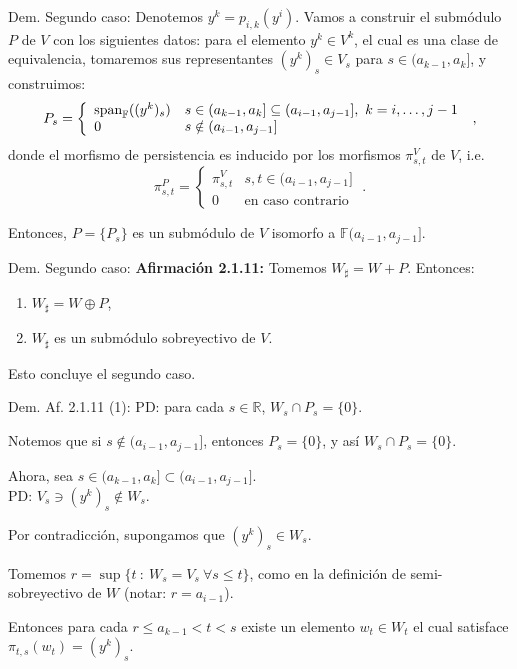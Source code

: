 \documentclass{beamer}
\def\R{\mathbb{R}}
\def\F {\mathbb{F}}
\begin{document}
\begin{frame}{Dem. Segundo caso:}
    Denotemos $y^k = p_{i,k} (y^i)$.
Vamos a construir el submódulo $P$ de $V$ con los siguientes datos: \pause para el elemento $y^k \in V^k$, el cual es una clase de equivalencia, tomaremos sus representantes $(y^k)_s \in V_s$ para $s\in  (a_{k-1}, a_{k}]$,  y construimos:
$$
P_s = \left\{
	\begin{array}{ll}
		\spn_{\F}((y^k)_s) 	& s \in (a_{k-1}, a_{k}] \subseteq (a_{i-1},a_{j-1}],\ k=i, \ldots, j-1 \\
  		0  					& s \notin (a_{i-1}, a_{j-1}] 
	\end{array}
		\right. \;,
$$
\pause donde el morfismo de persistencia es inducido por los morfismos  $\pi^V_{s,t}$ de $V$, i.e.
$$
\pi^P_{s,t} = \left\{
\begin{array}{ll}
	\pi^V_{s,t}  	& s, t \in (a_{i-1}, a_{j-1}]  \\
	0 				& \text{en caso contrario}
\end{array}
\right. \;.
$$

Entonces, $P = \{P_s\}$ es un submódulo de $V$ isomorfo a $\F (a_{i-1}, a_{j-1}]$.

\end{frame}


\begin{frame}{Dem. Segundo caso:}
    \textbf{Afirmación 2.1.11:} 
	Tomemos $W_{\sharp} = W + P$. Entonces:
\begin{enumerate}
	\item
		$W_{\sharp} = W \oplus P$,
	\item
		$W_{\sharp}$ es un submódulo sobreyectivo de $V$.
\end{enumerate}

Esto concluye el segundo caso.

\end{frame}

\begin{frame}{Dem. Af. 2.1.11 (1):}
PD: para cada $s\in \R$, $W_s \cap P_s = \{0\}$. \\[0.2cm ]\pause

Notemos que si $s \notin (a_{i-1}, a_{j-1}]$, entonces $P_s = \{0\}$, y así $W_s \cap P_s = \{0\}$.\\[0.2cm] \pause

Ahora, sea $s\in (a_{k-1}, a_{k}] \subset (a_{i-1}, a_{j-1}]$. \\

PD: $V_s \ni (y^k)_s \notin W_s$.\\[0.2cm] \pause

Por contradicción, supongamos que $(y^k)_s \in W_s$. \pause

Tomemos $r = \sup \{ t\ :\ W_s=V_s \ \forall s\leq t \}$, como en la definición de semi-sobreyectivo de $W$ (notar: $r=a_{i-1}$). \pause

Entonces para cada $r \leq a_{k-1} < t < s$ existe un elemento  $w_t \in W_t$ el cual satisface $\pi_{t,s} (w_t)=(y^k)_s$. \pause

\end{frame}
\end{document}
